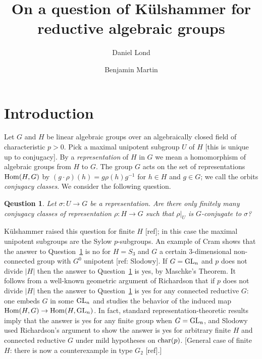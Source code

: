 \documentclass[12pt]{amsart}
\title[On a question of K\"ulshammer for reductive algebraic groups]
{On a question of K\"ulshammer for reductive algebraic groups}
\author[D. Lond]{Daniel Lond}
\author[B.\ Martin]{Benjamin Martin}
\newcommand\ra{\rightarrow}
\numberwithin{equation}{section}
\newtheorem{qn}[equation]{Qeustion}
\theoremstyle{definition}
\theoremstyle{remark}
\theoremstyle{remark}
\begin{document}
\begin{abstract}
\end{abstract}


\maketitle

\section{Introduction}

Let $G$ and $H$ be linear algebraic groups over an algebraically closed field of characteristic $p> 0$.  Pick a maximal unipotent subgroup $U$ of $H$ [this is unique up to conjugacy].  By a {\em representation} of $H$ in $G$ we mean a homomorphism of algebraic groups from $H$ to $G$.  The group $G$ acts on the set of representations ${\rm Hom}(H,G)$ by $(g\cdot \rho)(h)= g\rho(h)g^{-1}$ for $h\in H$ and $g\in G$; we call the orbits {\em conjugacy classes}.  We consider the following question.

\begin{qn}
\label{qn:algKQ}
 Let $\sigma\colon U\ra G$ be a representation.  Are there only finitely many conjugacy classes of representation $\rho\colon H\ra G$ such that $\rho|_U$ is $G$-conjugate to $\sigma$?
\end{qn}

K\"ulshammer raised this question for finite $H$
[ref]; in this case the maximal unipotent subgroups are the Sylow $p$-subgroups.  An example of Cram shows that the answer to Question~\ref{qn:algKQ} is no for $H= S_3$ and $G$ a certain 3-dimensional non-connected group with $G^0$ unipotent [ref: Slodowy].
If $G= {\rm GL}_n$ and $p$ does not divide $|H|$ then the answer to Question~\ref{qn:algKQ} is yes, by Maschke's Theorem.  It follows from a well-known geometric argument of Richardson that if $p$ does not divide $|H|$ then the answer to Question~\ref{qn:algKQ} is yes for any connected reductive $G$: one embeds $G$ in some ${\rm GL}_n$ and studies the behavior of the induced map ${\rm Hom}(H,G)\ra {\rm Hom}(H,{\rm GL}_n)$.  In fact, standard representation-theoretic results imply that the answer is yes for any finite group when $G= {\rm GL}_n$, and Slodowy used Richardson's argument to show the answer is yes for arbitrary finite $H$ and connected reductive $G$ under mild hypotheses on ${\rm char}(p)$.  [General case of finite $H$: there is now a counterexample in type $G_2$ [ref].]
\end{document}
